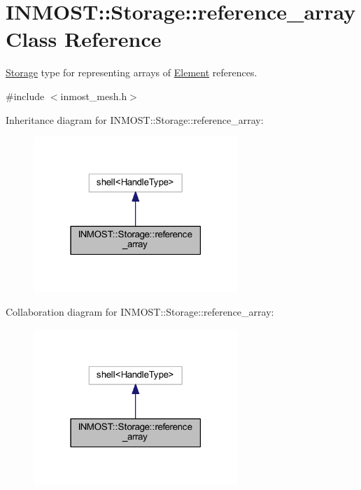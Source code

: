 \hypertarget{classINMOST_1_1Storage_1_1reference__array}{\section{I\-N\-M\-O\-S\-T\-:\-:Storage\-:\-:reference\-\_\-array Class Reference}
\label{classINMOST_1_1Storage_1_1reference__array}
}


\hyperlink{classINMOST_1_1Storage}{Storage} type for representing arrays of \hyperlink{classINMOST_1_1Element}{Element} references.  




{\ttfamily \#include $<$inmost\-\_\-mesh.\-h$>$}



Inheritance diagram for I\-N\-M\-O\-S\-T\-:\-:Storage\-:\-:reference\-\_\-array\-:\nopagebreak
\begin{figure}[H]
\begin{center}
\leavevmode
\includegraphics[width=219pt]{classINMOST_1_1Storage_1_1reference__array__inherit__graph}
\end{center}
\end{figure}


Collaboration diagram for I\-N\-M\-O\-S\-T\-:\-:Storage\-:\-:reference\-\_\-array\-:\nopagebreak
\begin{figure}[H]
\begin{center}
\leavevmode
\includegraphics[width=219pt]{classINMOST_1_1Storage_1_1reference__array__coll__graph}
\end{center}
\end{figure}

